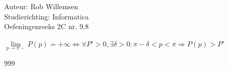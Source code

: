 \documentclass[a4paper]{article}
\begin{document}
\noindent \large Auteur: Rob Willemsen \\
\noindent \large Studierichting: Informatica\\
\noindent \large Oefeningenreeks 2C nr. 9.8\\

\medskip

\normalsize

$\lim\limits_{p \rightarrow \pi-} P(p) = +\infty \Leftrightarrow \forall P' > 0, \exists \delta > 0 : \pi - \delta < p < \pi \Rightarrow P(p) > P'$ \\

\begin{thebibliography}{999}
\end{thebibliography}
\end{document}
